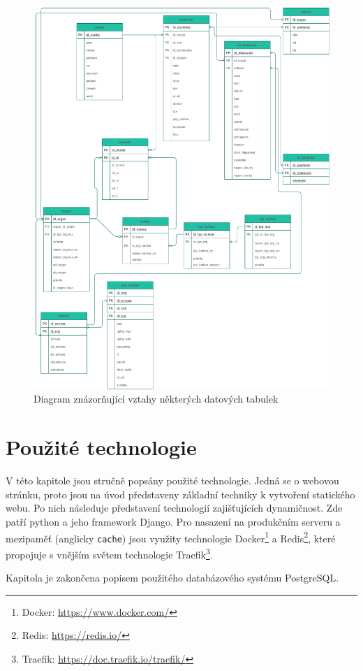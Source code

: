 \begin{figure}
    \centering
    \includegraphics[width=1\textwidth]{obrazky-figures/data_diagramy.pdf}
    \caption{Diagram znázorňující vztahy některých datových tabulek}
    \label{fig:psp-data-diagram}
\end{figure}




\chapter{Použité technologie}
\label{chap:technologie}
V této kapitole jsou stručně popsány použité technologie. Jedná se o webovou stránku, proto jsou na úvod představeny základní techniky k vytvoření statického webu. Po nich následuje představení technologií zajišťujících dynamičnost. Zde patří python a jeho framework Django. Pro nasazení na produkčním serveru a mezipaměť (anglicky \texttt{cache}) jsou využity technologie Docker\footnote{Docker: \url{https://www.docker.com/}} a Redis\footnote{Redis: \url{https://redis.io/}}, které propojuje s vnějším světem technologie Traefik\footnote{Traefik: \url{https://doc.traefik.io/traefik/}}.
\par Kapitola je zakončena popisem použitého databázového systému PostgreSQL.


